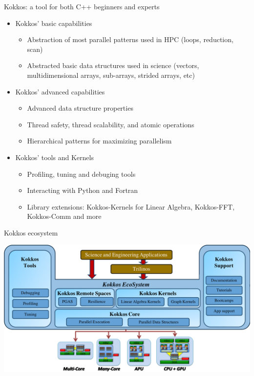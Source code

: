 \documentclass[aspectratio=169]{beamer}
\begin{document}
\begin{frame}{Kokkos: a tool for both C++ beginners and experts}
    \begin{itemize}
        \item Kokkos' basic capabilities
        \begin{itemize}
            \item Abstraction of most parallel patterns used in HPC (loops, reduction, scan)
            \item Abstracted basic data structures used in science (vectors, multidimensional arrays, sub-arrays, strided arrays, etc)
        \end{itemize}
        \item Kokkos' advanced capabilities
        \begin{itemize}
            \item Advanced data structure properties
            \item Thread safety, thread scalability, and atomic operations
            \item Hierarchical patterns for maximizing parallelism
        \end{itemize}
        \item Kokkos' tools and Kernels
        \begin{itemize}
            \item Profiling, tuning and debuging tools
            \item Interacting with Python and Fortran
            \item Library extensions: Kokkos-Kernels for Linear Algebra, Kokkos-FFT, Kokkos-Comm and more
        \end{itemize}
    \end{itemize}
\end{frame}


\begin{frame}{Kokkos ecosystem}
    \begin{center}
        \includegraphics[width=\textwidth]{kokkos-ecosystem.png}
    \end{center}
\end{frame}
\end{document}
